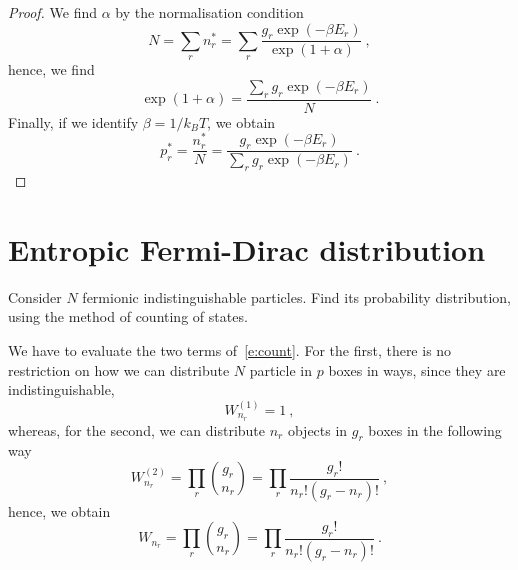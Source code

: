 \begin{proof}
        We find $\alpha$ by the normalisation condition 
        \begin{equation*}
            N = \sum_r n_r^* = \sum_r \frac{g_r \exp(- \beta E_r)}{\exp(1 + \alpha)} ~,
        \end{equation*}
        hence, we find
        \begin{equation*}
            \exp(1 + \alpha) = \frac{\sum_r g_r \exp(- \beta E_r)}{N} ~.
        \end{equation*}
        Finally, if we identify $\beta = 1/k_B T$, we obtain
        \begin{equation*}
            p_r^* = \frac{n_r^*}{N} = \frac{g_r \exp(- \beta E_r)}{\sum_r g_r \exp(- \beta E_r)} ~.
        \end{equation*}
    \end{proof}
    
\section{Entropic Fermi-Dirac distribution}

    \begin{exercise}
        Consider $N$ fermionic indistinguishable particles. Find its probability distribution, using the method of counting of states.
    \end{exercise}

    We have to evaluate the two terms of~\eqref{e:count}. For the first, there is no restriction on how we can distribute $N$ particle in $p$ boxes in ways, since they are indistinguishable,
    \begin{equation*}
        W^{(1)}_{n_r} = 1 ~,
    \end{equation*}
    whereas, for the second, we can distribute $n_r$ objects in $g_r$ boxes in the following way
    \begin{equation*}
        W^{(2)}_{n_r} = \prod_r \binom{g_r}{n_r} = \prod_r \frac{g_r!}{n_r! (g_r - n_r)!} ~,
    \end{equation*}
    hence, we obtain
    \begin{equation*}
        W_{n_r} = \prod_r \binom{g_r}{n_r} = \prod_r \frac{g_r!}{n_r! (g_r - n_r)!} ~.
    \end{equation*}
    
